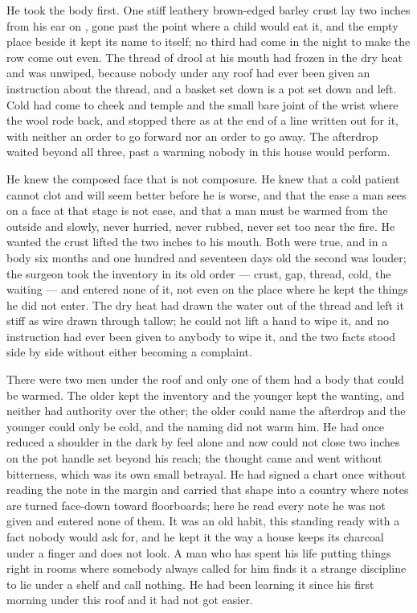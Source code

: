He took the body first. One stiff leathery brown-edged barley crust lay two inches from his ear on , gone past the point where a child would eat it, and the empty place beside it kept its name to itself; no third had come in the night to make the row come out even. The thread of drool at his mouth had frozen in the dry heat and was unwiped, because nobody under any roof had ever been given an instruction about the thread, and a basket set down is a pot set down and left. Cold had come to cheek and temple and the small bare joint of the wrist where the wool rode back, and stopped there as at the end of a line written out for it, with neither an order to go forward nor an order to go away. The afterdrop waited beyond all three, past a warming nobody in this house would perform.

He knew the composed face that is not composure. He knew that a cold patient cannot clot and will seem better before he is worse, and that the ease a man sees on a face at that stage is not ease, and that a man must be warmed from the outside and slowly, never hurried, never rubbed, never set too near the fire. He wanted the crust lifted the two inches to his mouth. Both were true, and in a body six months and one hundred and seventeen days old the second was louder; the surgeon took the inventory in its old order --- crust, gap, thread, cold, the waiting --- and entered none of it, not even on the place where he kept the things he did not enter. The dry heat had drawn the water out of the thread and left it stiff as wire drawn through tallow; he could not lift a hand to wipe it, and no instruction had ever been given to anybody to wipe it, and the two facts stood side by side without either becoming a complaint.

There were two men under the roof and only one of them had a body that could be warmed. The older kept the inventory and the younger kept the wanting, and neither had authority over the other; the older could name the afterdrop and the younger could only be cold, and the naming did not warm him. He had once reduced a shoulder in the dark by feel alone and now could not close two inches on the pot handle set beyond his reach; the thought came and went without bitterness, which was its own small betrayal. He had signed a chart once without reading the note in the margin and carried that shape into a country where notes are turned face-down toward floorboards; here he read every note he was not given and entered none of them. It was an old habit, this standing ready with a fact nobody would ask for, and he kept it the way a house keeps its charcoal under a finger and does not look. A man who has spent his life putting things right in rooms where somebody always called for him finds it a strange discipline to lie under a shelf and call nothing. He had been learning it since his first morning under this roof and it had not got easier.

